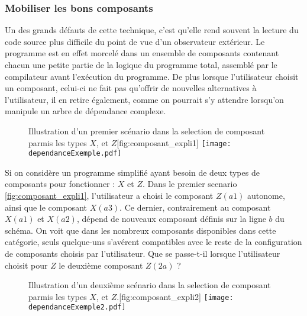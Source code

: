 \subsubsection{Mobiliser les bons composants}

Un des grands défauts de cette technique, c'est qu'elle rend souvent la lecture du code source plus difficile du point de vue d'un observateur extérieur. Le programme est en effet morcelé dans un ensemble de composants contenant chacun une petite partie de la logique du programme total, assemblé par le compilateur avant l'exécution du programme. De plus lorsque l'utilisateur choisit un composant, celui-ci ne fait pas qu'offrir de nouvelles alternatives à l'utilisateur, il en retire également, comme on pourrait s'y attendre lorsqu'on manipule un arbre de dépendance complexe.

\begin{figure}[!htbp]
	\begin{sidecaption}{Illustration d'un premier scénario dans la selection de composant parmis les types $X$, et $Z$}[fig:composant_expli1]
		\centering
		\texttt{[image: dependanceExemple.pdf]}{
		}
  \end{sidecaption}
\end{figure}

Si on considère un programme simplifié ayant besoin de deux types de composants pour fonctionner : $X$ et $Z$. Dans le premier scenario \ref{fig:composant_expli1}, l'utilisateur a choisi le composant $Z(a1)$ autonome, ainsi que le composant $X(a3)$. Ce dernier, contrairement au composant $X(a1)$ et $X(a2)$, dépend de nouveaux composant définis sur la ligne $b$ du schéma. On voit que dans les nombreux composants disponibles dans cette catégorie, seuls quelque-uns s'avérent compatibles avec le reste de la configuration de composants choisis par l'utilisateur. Que se passe-t-il lorsque l'utilisateur choisit pour $Z$ le deuxième composant $Z(2a)$ ?

\begin{figure}[!htbp]
	\begin{sidecaption}{Illustration d'un deuxième scénario dans la selection de composant parmis les types $X$, et $Z$.}[fig:composant_expli2]
		\centering
		\texttt{[image: dependanceExemple2.pdf]}{
		}
  \end{sidecaption}
\end{figure}

